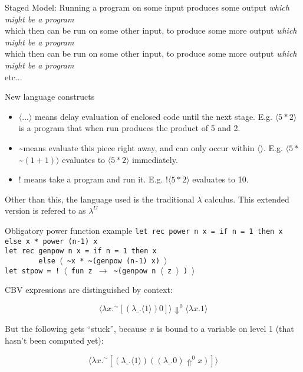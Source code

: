 \documentclass{beamer}
\begin{document}
\begin{frame}
Staged Model: Running a program on some input produces some output \textit{which might be a program}\\
which then can be run on some other input, to produce some more output \textit{which might be a program}\\
which then can be run on some other input, to produce some more output \textit{which might be a program}\\
etc...
\end{frame}

\begin{frame}{New language constructs}
\begin{itemize}
  \item $\langle ... \rangle$ means delay evaluation of enclosed code until the next stage. E.g. $\langle 5 * 2 \rangle$ is a program that when run produces the product of 5 and 2.
  \item \textasciitilde means evaluate this piece right away, and can only occur within $\langle \rangle$. E.g. $\langle 5 * $\textasciitilde $(1 + 1)\rangle$ evaluates to $\langle 5 * 2\rangle$ immediately.
  \item $!$ means take a program and run it. E.g. $!\langle 5 * 2 \rangle$ evaluates to 10.
\end{itemize}

Other than this, the language used is the traditional $\lambda$ calculus. This extended version is refered to as $\lambda ^U$
\end{frame}

\begin{frame}{Obligatory power function example}
\small
\texttt{let rec power n x = if n = 1 then x else x * power (n-1) x}\\
\texttt{let rec genpow n x = if n = 1 then x}\\
\texttt{\ \ \ \ \ \ \ \ else $\langle$ \textasciitilde x * \textasciitilde (genpow (n-1) x) $\rangle$}\\
\texttt{let stpow = ! $\langle$ fun z $\rightarrow$ \textasciitilde (genpow n $\langle$ z $\rangle$ ) $\rangle$}
\end{frame}

\begin{frame}
CBV expressions are distinguished by context: 

\begin{equation*}
\langle \lambda x.^\sim [(\lambda\_.\langle 1 \rangle) 0] \rangle
\Downarrow^0 \langle \lambda x.1 \rangle
\end{equation*}


But the following gets ``stuck'', because $x$ is bound to a variable
on level 1 (that hasn't been computed yet):

\begin{equation*}
\langle \lambda x.^\sim [(\lambda\_.\langle 1 \rangle)
 ((\lambda\_.0) \Uparrow^0
 x)] \rangle
\end{equation*}

\end{frame}
\end{document}
